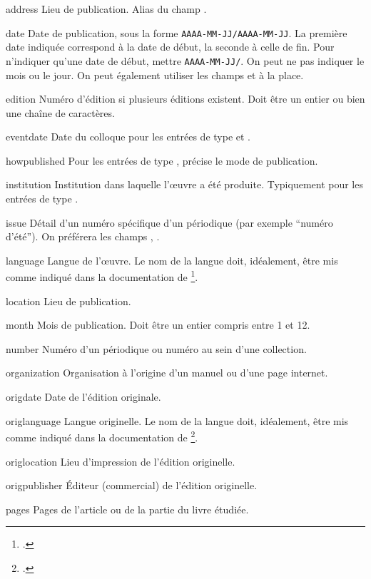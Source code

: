 \begin{choix}
	\item[address]
	Lieu de publication. Alias du champ .	
	\item[date] 
	Date de publication, sous la forme \verb|AAAA-MM-JJ/AAAA-MM-JJ|.
	La première date indiquée correspond à la date de début, la seconde à celle de fin. Pour n'indiquer qu'une date de début, mettre \verb|AAAA-MM-JJ/|. 
	On peut ne pas indiquer le mois ou le jour. On peut également utiliser les champs  et  à la place. 
   	\item[edition]
	Numéro d'édition si plusieurs éditions existent. Doit être un entier ou bien une chaîne de caractères.
   	\item[eventdate] Date du colloque pour les entrées de type  et . 
	\item[howpublished] Pour les entrées de type , précise le mode de publication.
   	\item[institution] Institution dans laquelle l'œuvre a été produite. Typiquement pour les entrées de type . 
   	\item[issue] Détail d'un numéro spécifique d'un périodique (par exemple \enquote{numéro d'été}). On préférera les champs , .	
   	\item[language] Langue de l'œuvre. Le nom de la langue doit, idéalement, être mis comme indiqué dans la documentation de \footcite{polyglossia}.					
   	\item[location] Lieu de publication.  					
   	\item[month] Mois de publication. Doit être un entier compris entre 1 et 12. 
   	\item[number] Numéro d'un périodique ou numéro au sein d'une collection. 	
   	\item[organization] Organisation à l'origine d'un manuel ou d'une page internet.	
   	\item[origdate] Date de l'édition originale.						
   	\item[origlanguage] Langue originelle. Le nom de la langue doit, idéalement, être mis comme indiqué dans la documentation de \footcite{polyglossia}. 
   	\item[origlocation] Lieu d'impression de l'édition originelle.		
   	\item[origpublisher] Éditeur (commercial) de l'édition originelle.		
	\item[pages] Pages de l'article ou de la partie du livre étudiée. 

\end{choix}

